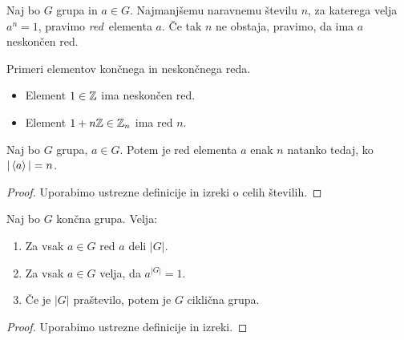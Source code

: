 \begin{definicija}
    Naj bo $G$ grupa in $a \in G$. Najmanjšemu naravnemu številu $n$, za katerega velja $a^n=1$, pravimo \emph{red}~elementa $a$. Če tak $n$ ne obstaja, pravimo, da ima $a$ neskončen red.
\end{definicija}

\begin{primer}
    Primeri elementov končnega in neskončnega reda.
    \begin{itemize}
        \item Element $1 \in \mathbb{Z}$ ima neskončen red.
        \item Element $1 + n\mathbb{Z} \in \mathbb{Z}_n$ ima red $n$.
    \end{itemize}    
\end{primer}

\begin{trditev}
    Naj bo $G$ grupa, $a \in G$. Potem je red elementa $a$ enak $n$ natanko tedaj, ko $|\left\langle {a} \right\rangle| = n$.
\end{trditev}

\begin{proof}
    Uporabimo ustrezne definicije in izreki o celih številih.
\end{proof}

\begin{posledica}
    Naj bo $G$ končna grupa. Velja:
    \begin{enumerate}
        \item Za vsak $a \in G$ red $a$ deli $|G|$.
        \item Za vsak $a \in G$ velja, da $a^{|G|} = 1$.
        \item Če je $|G|$ praštevilo, potem je $G$ ciklična grupa. 
    \end{enumerate}
\end{posledica}

\begin{proof}
    Uporabimo ustrezne definicije in izreki.
\end{proof}